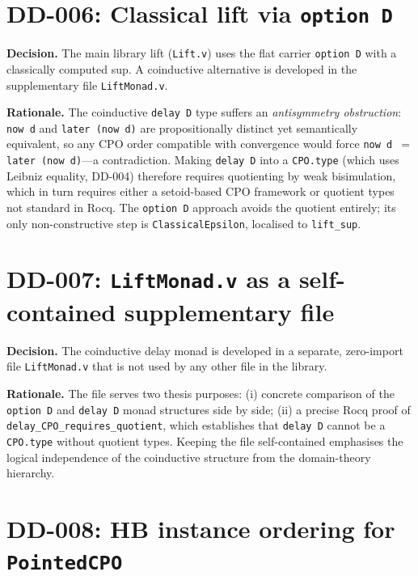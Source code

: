 \section*{DD-006: Classical lift via \texttt{option~D}}

\textbf{Decision.}
The main library lift (\texttt{Lift.v}) uses the flat carrier
\texttt{option~D} with a classically computed sup.  A coinductive
alternative is developed in the supplementary file \texttt{LiftMonad.v}.

\textbf{Rationale.}
The coinductive \texttt{delay~D} type suffers an \emph{antisymmetry
obstruction}: \texttt{now~d} and \texttt{later~(now~d)} are
propositionally distinct yet semantically equivalent, so any CPO order
compatible with convergence would force
\texttt{now~d $=$ later~(now~d)}---a contradiction.  Making
\texttt{delay~D} into a \texttt{CPO.type} (which uses Leibniz equality,
DD-004) therefore requires quotienting by weak bisimulation, which in
turn requires either a setoid-based CPO framework or quotient types not
standard in Rocq.  The \texttt{option~D} approach avoids the quotient
entirely; its only non-constructive step is \texttt{ClassicalEpsilon},
localised to \texttt{lift\_sup}.

\section*{DD-007: \texttt{LiftMonad.v} as a self-contained supplementary file}

\textbf{Decision.}
The coinductive delay monad is developed in a separate, zero-import file
\texttt{LiftMonad.v} that is not used by any other file in the library.

\textbf{Rationale.}
The file serves two thesis purposes: (i) concrete comparison of the
\texttt{option~D} and \texttt{delay~D} monad structures side by side;
(ii) a precise Rocq proof of \texttt{delay\_CPO\_requires\_quotient},
which establishes that \texttt{delay~D} cannot be a \texttt{CPO.type}
without quotient types.  Keeping the file self-contained emphasises the
logical independence of the coinductive structure from the domain-theory
hierarchy.

\section*{DD-008: HB instance ordering for \texttt{PointedCPO}}

